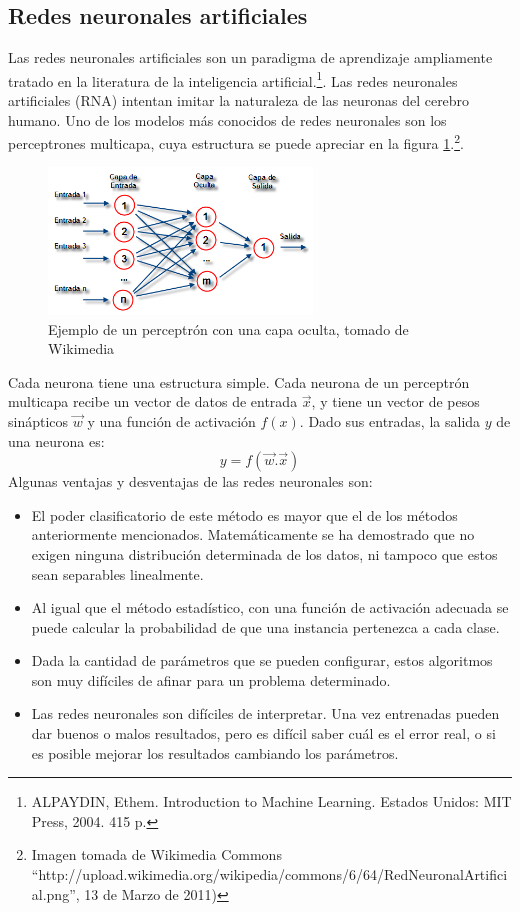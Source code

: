 \documentclass[a4paper, 11pt, oneside]{report}
\begin{document}
\subsection{Redes neuronales artificiales}
Las redes neuronales artificiales son un paradigma de aprendizaje ampliamente tratado en la literatura de la inteligencia artificial.\footnote{ALPAYDIN, Ethem. Introduction to Machine Learning. Estados Unidos: MIT Press, 2004. 415 p.}. Las redes neuronales artificiales (RNA) intentan imitar la naturaleza de las neuronas del cerebro humano. Uno de los modelos más conocidos de redes neuronales son los perceptrones multicapa, cuya estructura se puede apreciar en la figura \ref{fig:rna}.\footnote{Imagen tomada de Wikimedia Commons ``http://upload.wikimedia.org/wikipedia/commons/6/64/RedNeuronalArtificial.png'', 13 de Marzo de 2011)}.
\begin{figure}[htb]
\begin{center}
\leavevmode
\includegraphics[width=7cm]{img/rna.png}
\end{center}
\caption{Ejemplo de un perceptrón con una capa oculta, tomado de Wikimedia}
\label{fig:rna}
\end{figure}
Cada neurona tiene una estructura simple. Cada neurona de un perceptrón multicapa recibe un vector de datos de entrada $\vec{x}$, y tiene un vector de pesos sinápticos $\vec{w}$ y una función de activación $f(x)$. Dado sus entradas, la salida $y$ de una neurona es:
\[y = f(\vec{w}.\vec{x})\]
Algunas ventajas y desventajas de las redes neuronales son:
\begin{itemize}
\item El poder clasificatorio de este método es mayor que el de los métodos anteriormente mencionados. Matemáticamente se ha demostrado que no exigen ninguna distribución determinada de los datos, ni tampoco que estos sean separables linealmente.
\item Al igual que el método estadístico, con una función de activación adecuada se puede calcular la probabilidad de que una instancia pertenezca a cada clase.
\item Dada la cantidad de parámetros que se pueden configurar, estos algoritmos son muy difíciles de afinar para un problema determinado.
\item Las redes neuronales son difíciles de interpretar. Una vez entrenadas pueden dar buenos o malos resultados, pero es difícil saber cuál es el error real, o si es posible mejorar los resultados cambiando los parámetros.
\end{itemize}
\end{document}
